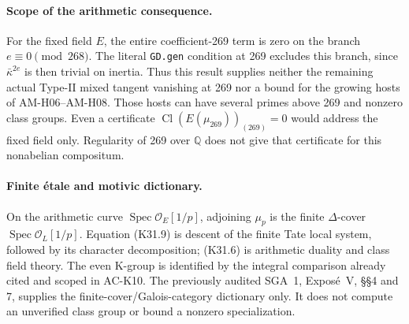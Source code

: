 \paragraph{Scope of the arithmetic consequence.}
For the fixed field \(E\), the entire coefficient-269 term is
zero on the branch \(e\equiv0\pmod{268}\).  The literal
\texttt{GD.gen} condition at 269 excludes this branch, since
\(\bar\kappa^{2e}\) is then trivial on inertia.  Thus this
result supplies neither the remaining actual Type-II mixed
tangent vanishing at 269 nor a bound for the growing hosts of
AM-H06--AM-H08.  Those hosts can have several primes above 269
and nonzero class groups.  Even a certificate
\(\operatorname{Cl}(E(\mu_{269}))_{(269)}=0\) would address
the fixed field only.  Regularity of 269 over \(\mathbb Q\)
does not give that certificate for this nonabelian compositum.

\paragraph{Finite \'etale and motivic dictionary.}
On the arithmetic curve \(\operatorname{Spec}\mathcal O_E[1/p]\),
adjoining \(\mu_p\) is the finite \(\Delta\)-cover
\(\operatorname{Spec}\mathcal O_L[1/p]\).  Equation (K31.9)
is descent of the finite Tate local system, followed by its
character decomposition; (K31.6) is arithmetic duality and
class field theory.  The even K-group is identified by the
integral comparison already cited and scoped in AC-K10.
The previously audited SGA~1, Expos\'e~V, \S\S4 and 7,
supplies the finite-cover/Galois-category dictionary only.
It does not compute an unverified class group or bound a
nonzero specialization.
